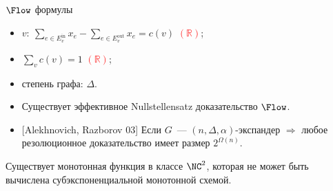 \begin{frame}{$\Flow$ формулы}
    \begin{minipage}{0.5 \linewidth}
        
    \end{minipage}%
    \begin{minipage}{0.5 \linewidth}
        \pause
        \pause
        \begin{itemize}
            \item $v\colon ~ \sum\limits_{e \in E^{\mathrm{in}}_v} x_{e} -
                \sum\limits_{e \in E^{\mathrm{out}}_v} x_{e} = c(v)$ 
                \textcolor{red}{$(\mathbb{R})$};
            \item $\sum\limits_{v} c(v) = 1$ \textcolor{red}{$(\mathbb{R})$};
            \item степень графа: $\Delta$.
        \end{itemize}
    \end{minipage}

    \pause
    \vspace{0.2cm}
    \begin{itemize}
        \item{} Существует эффективное Nullstellensatz доказательство $\Flow$.
        \item{} [Alekhnovich, Razborov 03] Если $G$~--- $(n, \Delta, \alpha)$-экспандер $\Rightarrow$
            любое резолюционное доказательство имеет размер $2^{\Omega(n)}$.
    \end{itemize}

    \pause

    \begin{corollary}
        Существует монотонная функция в классе $\NC^2$, которая не может быть вычислена
        субэкспоненциальной монотонной схемой.
    \end{corollary}

\end{frame}

